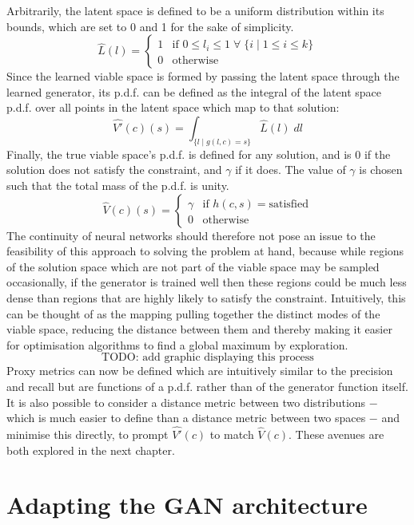 \documentclass[../../main.tex]{subfiles}
\begin{document}
Arbitrarily, the latent space is defined to be a uniform distribution within its bounds, which are set to 0 and 1 for the sake of simplicity.
$$\hat{L}(l) =
\left\{
	\begin{array}{ll}
		1 & \mbox{if } 0 \le l_i \le 1 \; \forall \; \{i \; | \; 1 \le i \le k\} \\
		0 & \mbox{otherwise}
	\end{array}
\right.$$
Since the learned viable space is formed by passing the latent space through the learned generator, its p.d.f. can be defined as the integral of the latent space p.d.f. over all points in the latent space which map to that solution:
$$\hat{V'}(c)(s) = \int_{\{l \; | \; g(l,c) = s\}} \hat{L}(l) \; dl$$
Finally, the true viable space's p.d.f. is defined for any solution, and is $0$ if the solution does not satisfy the constraint, and $\gamma$ if it does.
The value of $\gamma$ is chosen such that the total mass of the p.d.f. is unity.
$$\hat{V}(c)(s) =
\left\{
	\begin{array}{ll}
		\gamma & \mbox{if } h(c,s) = \text{satisfied} \\
		0 & \mbox{otherwise}
	\end{array}
\right.$$
The continuity of neural networks should therefore not pose an issue to the feasibility of this approach to solving the problem at hand, because while regions of the solution space which are not part of the viable space may be sampled occasionally, if the generator is trained well then these regions could be much less dense than regions that are highly likely to satisfy the constraint.
Intuitively, this can be thought of as the mapping pulling together the distinct modes of the viable space, reducing the distance between them and thereby making it easier for optimisation algorithms to find a global maximum by exploration.
$$\text{TODO: add graphic displaying this process}$$
Proxy metrics can now be defined which are intuitively similar to the precision and recall but are functions of a p.d.f. rather than of the generator function itself.
It is also possible to consider a distance metric between two distributions $-$ which is much easier to define than a distance metric between two spaces $-$ and minimise this directly, to prompt $\hat{V'}(c)$ to match $\hat{V}(c)$.
These avenues are both explored in the next chapter.

\section{Adapting the GAN architecture} \label{section:adaptingTheGANArchitecture}
\end{document}
